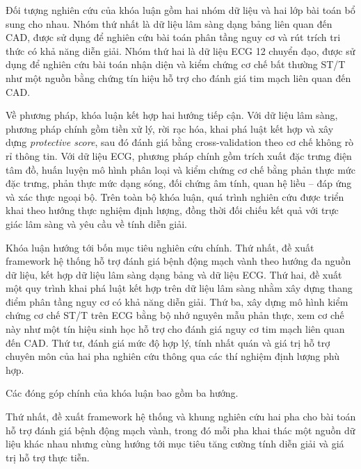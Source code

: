\blocksep

Đối tượng nghiên cứu của khóa luận gồm hai nhóm dữ liệu và hai lớp bài toán bổ sung cho nhau. Nhóm thứ nhất là dữ liệu lâm sàng dạng bảng liên quan đến CAD, được sử dụng để nghiên cứu bài toán phân tầng nguy cơ và rút trích tri thức có khả năng diễn giải. Nhóm thứ hai là dữ liệu ECG 12 chuyển đạo, được sử dụng để nghiên cứu bài toán nhận diện và kiểm chứng cơ chế bất thường ST/T như một nguồn bằng chứng tín hiệu hỗ trợ cho đánh giá tim mạch liên quan đến CAD.

\blocksep

Về phương pháp, khóa luận kết hợp hai hướng tiếp cận. Với dữ liệu lâm sàng, phương pháp chính gồm tiền xử lý, rời rạc hóa, khai phá luật kết hợp và xây dựng \textit{protective score}, sau đó đánh giá bằng cross-validation theo cơ chế không rò rỉ thông tin. Với dữ liệu ECG, phương pháp chính gồm trích xuất đặc trưng điện tâm đồ, huấn luyện mô hình phân loại và kiểm chứng cơ chế bằng phản thực mức đặc trưng, phản thực mức dạng sóng, đối chứng âm tính, quan hệ liều -- đáp ứng và xác thực ngoại bộ. Trên toàn bộ khóa luận, quá trình nghiên cứu được triển khai theo hướng thực nghiệm định lượng, đồng thời đối chiếu kết quả với trực giác lâm sàng và yêu cầu về tính diễn giải.

\blocksep
{}

\blocksep

Khóa luận hướng tới bốn mục tiêu nghiên cứu chính. Thứ nhất, đề xuất framework hệ thống hỗ trợ đánh giá bệnh động mạch vành theo hướng đa nguồn dữ liệu, kết hợp dữ liệu lâm sàng dạng bảng và dữ liệu ECG. Thứ hai, đề xuất một quy trình khai phá luật kết hợp trên dữ liệu lâm sàng nhằm xây dựng thang điểm phân tầng nguy cơ có khả năng diễn giải. Thứ ba, xây dựng mô hình kiểm chứng cơ chế ST/T trên ECG bằng bộ nhớ nguyên mẫu phản thực, xem cơ chế này như một tín hiệu sinh học hỗ trợ cho đánh giá nguy cơ tim mạch liên quan đến CAD. Thứ tư, đánh giá mức độ hợp lý, tính nhất quán và giá trị hỗ trợ chuyên môn của hai pha nghiên cứu thông qua các thí nghiệm định lượng phù hợp.

\blocksep
{}
\blocksep

Các đóng góp chính của khóa luận bao gồm ba hướng.

Thứ nhất, đề xuất framework hệ thống và khung nghiên cứu hai pha cho bài toán hỗ trợ đánh giá bệnh động mạch vành, trong đó mỗi pha khai thác một nguồn dữ liệu khác nhau nhưng cùng hướng tới mục tiêu tăng cường tính diễn giải và giá trị hỗ trợ thực tiễn.

